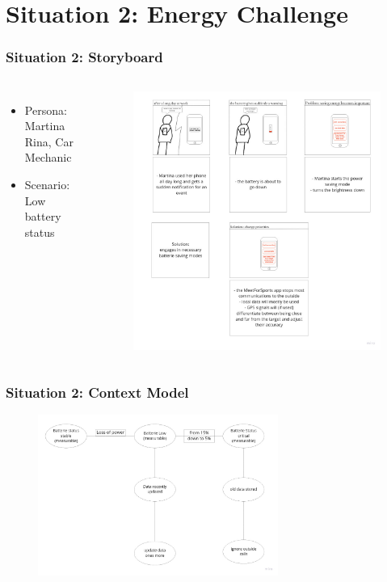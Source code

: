 \documentclass[aspectratio=169]{beamer}
\begin{document}
\section{Situation 2:  Energy Challenge}
\begin{frame}   
	\frametitle{Situation 2:  Storyboard}
	\begin{columns}
		\begin{itemize}
			\item Persona: Martina Rina, Car Mechanic
			\item Scenario: Low battery status
		\end{itemize}
		 \begin{figure}
			\centering
			\includegraphics[width=1\textwidth]{media/storyboard2.jpg}
		\end{figure}
	\end{columns}
\end{frame}

\begin{frame}
	\frametitle{Situation 2: Context Model}
	 \begin{figure}
		\centering
		\includegraphics[width=0.7\textwidth]{media/contextmodel2.jpg}
	\end{figure}
\end{frame}
\end{document}
